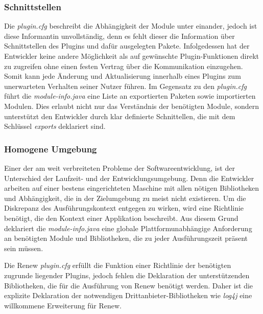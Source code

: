 \subsubsection{Schnittstellen}
Die \textit{plugin.cfg} beschreibt die Abhängigkeit der Module unter einander, jedoch ist diese Informantin unvollständig, denn es fehlt dieser die Information über Schnittstellen des Plugins und dafür ausgelegten Pakete. Infolgedessen hat der Entwickler keine andere Möglichkeit als auf gewünschte Plugin-Funktionen direkt zu zugreifen ohne einen festen Vertrag über die Kommunikation einzugehen. Somit kann jede Änderung und Aktualisierung innerhalb eines Plugins zum unerwarteten Verhalten seiner Nutzer führen. Im Gegensatz zu den \textit{plugin.cfg} führt die \textit{module-info.java} eine Liste an exportierten Paketen sowie importierten Modulen. Dies erlaubt nicht nur das Verständnis der benötigten Module, sondern unterstützt den Entwickler durch klar definierte Schnittellen, die mit dem Schlüssel \textit{exports} deklariert sind.

\subsubsection{Homogene Umgebung}
Einer der am weit verbreiteten Probleme der Softwareentwicklung, ist der Unterschied der Laufzeit- und der Entwicklungsumgebung. Denn die Entwickler arbeiten auf einer bestens eingerichteten Maschine mit allen nötigen Bibliotheken und Abhängigkeit, die in der Zielumgebung zu meist nicht existieren. Um die Diskrepanz des Ausführungskontext entgegen zu wirken, wird eine Richtlinie benötigt, die den Kontext einer Applikation beschreibt. Aus diesem Grund deklariert die \textit{module-info.java} eine globale Plattformunabhängige Anforderung an benötigten Module und Bibliotheken, die zu jeder Ausführungszeit präsent sein müssen. 
\bigbreak

Die Renew \textit{plugin.cfg} erfüllt die Funktion einer Richtlinie der benötigten zugrunde liegender Plugins, jedoch fehlen die Deklaration der unterstützenden Bibliotheken, die für die Ausführung von Renew benötigt werden. Daher ist die explizite Deklaration der notwendigen Drittanbieter-Bibliotheken wie \textit{log4j} eine willkommene Erweiterung für Renew. 

